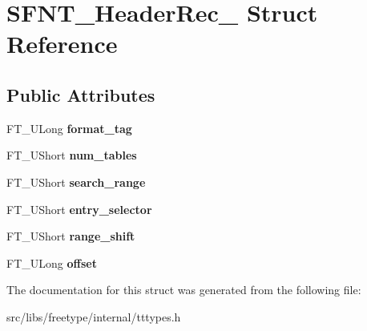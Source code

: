 \hypertarget{struct_s_f_n_t___header_rec__}{
\section{SFNT\_\-HeaderRec\_\- Struct Reference}
\label{struct_s_f_n_t___header_rec__}
}
\subsection*{Public Attributes}
\begin{DoxyCompactItemize}
\item 
\hypertarget{struct_s_f_n_t___header_rec___ad59d649b189ab19fae02341e95e02448}{
FT\_\-ULong {\bfseries format\_\-tag}}
\label{struct_s_f_n_t___header_rec___ad59d649b189ab19fae02341e95e02448}

\item 
\hypertarget{struct_s_f_n_t___header_rec___a46d8d8bf8f2d8b6536eb5fa5704852e2}{
FT\_\-UShort {\bfseries num\_\-tables}}
\label{struct_s_f_n_t___header_rec___a46d8d8bf8f2d8b6536eb5fa5704852e2}

\item 
\hypertarget{struct_s_f_n_t___header_rec___a39ca0e21eaec6be602547bb2ed898d5d}{
FT\_\-UShort {\bfseries search\_\-range}}
\label{struct_s_f_n_t___header_rec___a39ca0e21eaec6be602547bb2ed898d5d}

\item 
\hypertarget{struct_s_f_n_t___header_rec___ada628a85486eb034abd56b872ecdcd78}{
FT\_\-UShort {\bfseries entry\_\-selector}}
\label{struct_s_f_n_t___header_rec___ada628a85486eb034abd56b872ecdcd78}

\item 
\hypertarget{struct_s_f_n_t___header_rec___aa2a39db194a8a9a0cc8504143ac4f5c1}{
FT\_\-UShort {\bfseries range\_\-shift}}
\label{struct_s_f_n_t___header_rec___aa2a39db194a8a9a0cc8504143ac4f5c1}

\item 
\hypertarget{struct_s_f_n_t___header_rec___a04f99ce2ff335f8702a4edf7132a3e04}{
FT\_\-ULong {\bfseries offset}}
\label{struct_s_f_n_t___header_rec___a04f99ce2ff335f8702a4edf7132a3e04}

\end{DoxyCompactItemize}


The documentation for this struct was generated from the following file:\begin{DoxyCompactItemize}
\item 
src/libs/freetype/internal/tttypes.h\end{DoxyCompactItemize}
